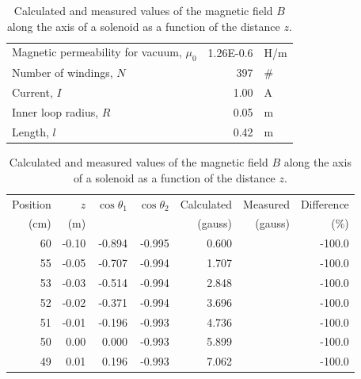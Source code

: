 \documentclass[../Elmag-labhefte-2020.tex]{subfiles}
\begin{document}
\begin{table}[h]
  \centering
  \caption{Calculated and measured values of the magnetic field $B$ along the axis of a solenoid as a function of the distance $z$.\label{tab:example-table3}}
  \scriptsize
  \begin{tabular}{lrl}
    \hline
    Magnetic permeability for vacuum, $\mu_0$ & 1.26E-0.6 & H/m\\
    Number of windings, $N$ & 397 & \#\\
    Current, $I$ & 1.00 & A\\
    Inner loop radius, $R$ & 0.05 & m\\
    Length, $l$ & 0.42 & m\\
    \hline
  \end{tabular}
  
  \vspace{1em}
  \begin{tabular}{rrrrrrr}
    \hline
    Position & $z$ & $\cos \theta_1$ & $\cos \theta _2$ & Calculated & Measured & Difference\\
    (cm) & (m) & & & (gauss) & (gauss) & (\%)\\
    \hline
60 & -0.10 & -0.894 & -0.995 & 0.600 &  & -100.0\\
55 & -0.05 & -0.707 & -0.994 & 1.707 &  & -100.0\\
53 & -0.03 & -0.514 & -0.994 & 2.848 &  & -100.0\\
52 & -0.02 & -0.371 & -0.994 & 3.696 &  & -100.0\\
51 & -0.01 & -0.196 & -0.993 & 4.736 &  & -100.0\\
50 & 0.00 & 0.000 & -0.993 & 5.899 &  & -100.0\\
49 & 0.01 & 0.196 & -0.993 & 7.062 &  & -100.0\\
  \end{tabular}
\end{table}
%
\begin{tabular}{rrrrrlr}
\end{tabular}

\end{document}
